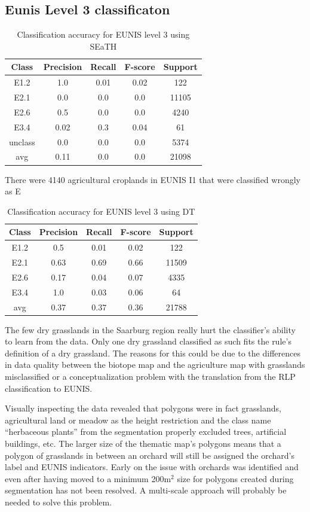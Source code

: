 \documentclass[authoryear, review,12pt,number]{elsarticle}
\begin{document}
{\subsection{Eunis Level 3 classificaton}
\begin{table}
\centering
\begin{tabular}{c c c c c}
Class & Precision & Recall & F-score & Support\\
\hline
E1.2 & 1.0 & 0.01 & 0.02 & 122\\
E2.1 & 0.0 & 0.0 & 0.0 & 11105\\
E2.6 & 0.5 & 0.0 & 0.0 & 4240\\
E3.4 & 0.02 & 0.3 & 0.04 & 61\\
unclass & 0.0 & 0.0 & 0.0 & 5374\\
avg & 0.11 & 0.0 & 0.0 & 21098\\
\end{tabular}
\caption{Classification accuracy for EUNIS level 3 using SEaTH}
\end{table}
There were 4140 agricultural croplands in EUNIS I1 that were classified wrongly 
as E 
\begin{table}
\centering
\begin{tabular}{c c c c c}
Class & Precision & Recall & F-score & Support\\
\hline
E1.2 & 0.5 & 0.01 & 0.02 & 122\\
E2.1 & 0.63 & 0.69 & 0.66 & 11509\\
E2.6 & 0.17 & 0.04 & 0.07 & 4335\\
E3.4 & 1.0 & 0.03 & 0.06 & 64\\
avg & 0.37 & 0.37 & 0.36 & 21788\\
\end{tabular}
\caption{Classification accuracy for EUNIS level 3 using DT}
\end{table}

The few dry grasslands in the Saarburg region really hurt the classifier's 
ability to learn from the data. Only one dry grassland classified as such fits 
the rule's definition of a dry grassland. The reasons for this could be due to 
the differences in data quality between the biotope map and the agriculture map 
with grasslands misclassified or a conceptualization problem with the 
translation from the RLP classification to EUNIS. 

Visually inspecting the data revealed that polygons were in fact grasslands, 
agricultural land or meadow as the height restriction and the class name 
``herbaceous plants'' from the segmentation properly excluded trees, artificial 
buildings, etc. The larger size of the thematic map's 
polygons means that a polygon of grasslands in between an orchard will still be 
assigned the orchard's label and EUNIS indicators. Early on the issue with
orchards was identified and even after having moved to a minimum 200m$^{2}$ size for
polygons created during segmentation has not been resolved. A multi-scale
approach will probably be needed to solve this problem.

}
\end{document}
